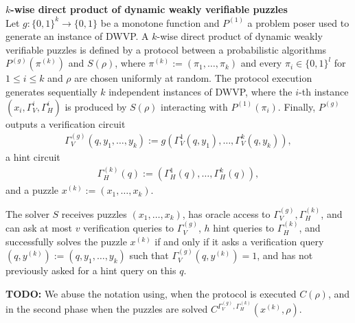 \begin{definition}{\textbf{$k$-wise direct product of dynamic weakly verifiable puzzles}}\\
Let $g: \{0,1\}^{k} \rightarrow \{0,1\}$ be a monotone function and $P^{(1)}$ a problem poser used to generate an instance of DWVP.
A $k$-wise direct product of dynamic weakly verifiable puzzles is defined by a protocol between a probabilistic algorithms $P^{(g)}(\pi^{(k)})$ and
$S(\rho)$, where $\pi^{(k)} := (\pi_1, \dots, \pi_k)$ and every $\pi_i \in \{0,1\}^{l}$ for $1 \leq i \leq k$ and $\rho$ are chosen uniformly at random.
The protocol execution generates sequentially $k$ independent instances of DWVP,
where the $i$-th instance $(x_i, \Gamma_V^{i}, \Gamma_H^{i} )$ is produced by $S(\rho)$ interacting with $P^{(1)}(\pi_i)$.
Finally, $P^{(g)}$ outputs a verification circuit
\begin{align*}
  \Gamma_V^{(g)} (q, y_1, \dots, y_k) := g(\Gamma_V^{1}(q, y_1), \dots, \Gamma_V^{k}(q, y_k)),
\end{align*}
a hint circuit
\begin{align*}
  \Gamma_H^{(k)} (q) := (\Gamma_H^{1}(q), \dots, \Gamma_H^{k}(q)),
\end{align*}
and a puzzle $x^{(k)} := (x_1, \dots, x_k)$.

The solver $S$ receives puzzles $(x_1, \dots, x_k)$, has oracle access to $\Gamma_V^{(g)}, \Gamma_H^{(k)}$, and
can ask at most $v$ verification queries to $\Gamma_V^{(g)}$, $h$ hint queries to $\Gamma_H^{(k)}$, and successfully solves the puzzle $x^{(k)}$
if and only if it asks a verification query $(q, y^{(k)}) := (q, y_1, \dots, y_k)$ such that $\Gamma_V^{(g)}(q, y^{(k)}) = 1$, and has not previously asked for a hint query on this $q$.
\end{definition}
%
\begin{todo}
  \textbf{TODO:} We abuse the notation using, when the protocol is executed $C(\rho)$, and in the second phase when the puzzles are solved $C^{\Gamma_V^{(g)}, \Gamma_H^{(k)}}(x^{(k)}, \rho)$.
\end{todo}
%

